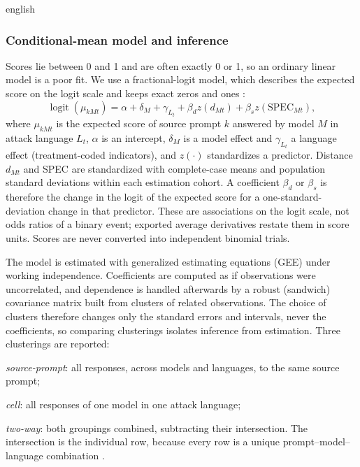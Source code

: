 \begin{otherlanguage*}{english}
\subsubsection{Conditional-mean model and inference}
Scores lie between 0 and 1 and are often exactly 0 or 1, so an ordinary linear model is a poor fit. We use a fractional-logit model, which describes the expected score on the logit scale and keeps exact zeros and ones \cite{papke1993fractional}:
\begin{equation}
\operatorname{logit}(\mu_{kMt})=\alpha+\delta_M+\gamma_{L_t}
+\beta_d z(d_{Mt})+\beta_s z(\mathrm{SPEC}_{Mt}),
\label{eq:graded-model}
\end{equation}
where $\mu_{kMt}$ is the expected score of source prompt $k$ answered by model $M$ in attack language $L_t$, $\alpha$ is an intercept, $\delta_M$ is a model effect and $\gamma_{L_t}$ a language effect (treatment-coded indicators), and $z(\cdot)$ standardizes a predictor. Distance $d_{Mt}$ and SPEC are standardized with complete-case means and population standard deviations within each estimation cohort. A coefficient $\beta_d$ or $\beta_s$ is therefore the change in the logit of the expected score for a one-standard-deviation change in that predictor. These are associations on the logit scale, not odds ratios of a binary event; exported average derivatives restate them in score units. Scores are never converted into independent binomial trials.

The model is estimated with generalized estimating equations (GEE) under working independence. Coefficients are computed as if observations were uncorrelated, and dependence is handled afterwards by a robust (sandwich) covariance matrix built from clusters of related observations. The choice of clusters therefore changes only the standard errors and intervals, never the coefficients, so comparing clusterings isolates inference from estimation. Three clusterings are reported:
\begin{alineas}
    \item \emph{source-prompt}: all responses, across models and languages, to the same source prompt;
    \item \emph{cell}: all responses of one model in one attack language;
    \item \emph{two-way}: both groupings combined, subtracting their intersection. The intersection is the individual row, because every row is a unique prompt--model--language combination \cite{cameron2011robust}.
\end{alineas}


\end{otherlanguage*}
